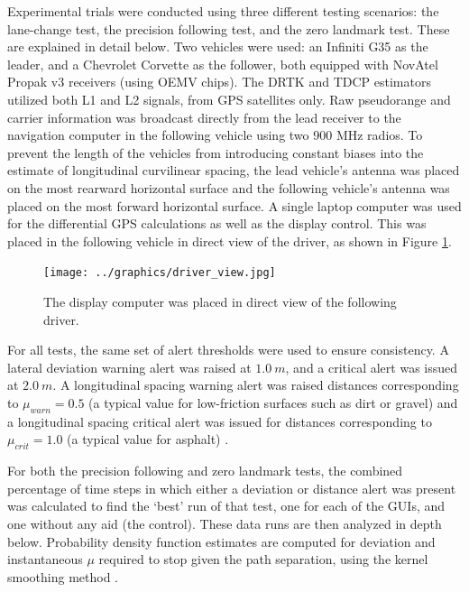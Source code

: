\documentclass[twocolumn,10pt]{article}
\begin{document}
  Experimental trials were conducted using three different testing scenarios: the lane-change test, the precision following test, and the zero landmark test.  These are explained in detail below.
  Two vehicles were used: an Infiniti G35 as the leader, and a Chevrolet Corvette as the follower, both equipped with NovAtel Propak v3 receivers (using OEMV chips).  The DRTK and TDCP estimators utilized both L1 and L2 signals, from GPS satellites only.  Raw pseudorange and carrier information was broadcast directly from the lead receiver to the navigation computer in the following vehicle using two 900 MHz radios.  To prevent the length of the vehicles from introducing constant biases into the estimate of longitudinal curvilinear spacing, the lead vehicle's antenna was placed on the most rearward horizontal surface and the following vehicle's antenna was placed on the most forward horizontal surface.
  A single laptop computer was used for the differential GPS calculations as well as the display control. This was placed in the following vehicle in direct view of the driver, as shown in Figure \ref{fig:driver_view}.

  \begin{figure}[ht] \centering
    \texttt{[image: ../graphics/driver\_view.jpg]}
    \caption{The display computer was placed in direct view of the following driver.}
    \label{fig:driver_view}
  \end{figure}

  For all tests, the same set of alert thresholds were used to ensure consistency. A lateral deviation warning alert was raised at $1.0~m$, and a critical alert was issued at $2.0~m$. A longitudinal spacing warning alert was raised distances corresponding to $\mu_{warn} = 0.5$ (a typical value for low-friction surfaces such as dirt or gravel) and a longitudinal spacing critical alert was issued for distances corresponding to $\mu_{crit}=1.0$ (a typical value for asphalt) \cite{mu}.

  For both the precision following and zero landmark tests, the combined percentage of time steps in which either a deviation or distance alert was present was calculated to find the `best' run of that test, one for each of the GUIs, and one without any aid (the control). These data runs are then analyzed in depth below.  Probability density function estimates are computed for deviation and instantaneous $\mu$ required to stop given the path separation, using the kernel smoothing method \cite{wand1995kernel}.
\end{document}
